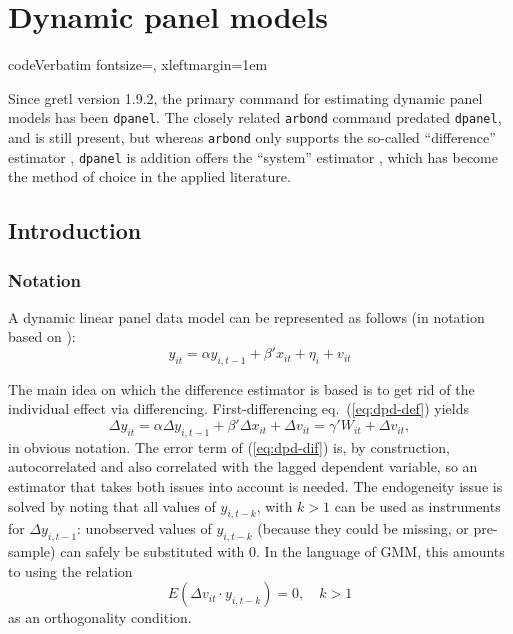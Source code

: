 \chapter{Dynamic panel models}
\label{chap:dpanel}

\newcommand{\by}{\boldsymbol{y}}
\newcommand{\bx}{\boldsymbol{x}}
\newcommand{\bv}{\boldsymbol{v}}
\newcommand{\bX}{\boldsymbol{X}}
\newcommand{\bW}{\boldsymbol{W}}
\newcommand{\bZ}{\boldsymbol{Z}}
\newcommand{\bA}{\boldsymbol{A}}
\newcommand{\biota}{\bm{\iota}}

\DefineVerbatimEnvironment%
{code}{Verbatim}
{fontsize=\small, xleftmargin=1em}

\newenvironment%
{altcode}%
{\vspace{1ex}\small\leftmargin 1em}{\vspace{1ex}}

Since gretl version 1.9.2, the primary command for estimating dynamic
panel models has been \texttt{dpanel}. The closely related
\texttt{arbond} command predated \texttt{dpanel}, and is still
present, but whereas \texttt{arbond} only supports the so-called
``difference'' estimator \citep{arellano-bond91}, \texttt{dpanel} is
addition offers the ``system'' estimator \citep{blundell-bond98},
which has become the method of choice in the applied literature.

\section{Introduction}
\subsection{Notation}
\label{sec:notation}

A dynamic linear panel data model can be represented as follows
(in notation based on \cite{arellano03}):
\begin{equation}
  \label{eq:dpd-def}
  y_{it} = \alpha y_{i,t-1} + \beta'x_{it} + \eta_{i} + v_{it}
\end{equation}

The main idea on which the difference estimator is based is to get rid
of the individual effect via differencing.  First-differencing eq.\
(\ref{eq:dpd-def}) yields
\begin{equation}
  \label{eq:dpd-dif}
  \Delta y_{it} = \alpha \Delta y_{i,t-1} + \beta'\Delta x_{it} +
  \Delta v_{it} = \gamma' W_{it} + \Delta v_{it} ,
\end{equation}
in obvious notation. The error term of (\ref{eq:dpd-dif}) is, by
construction, autocorrelated and also correlated with the lagged
dependent variable, so an estimator that takes both issues into
account is needed. The endogeneity issue is solved by noting that all
values of $y_{i,t-k}$, with $k>1$ can be used as instruments for
$\Delta y_{i,t-1}$: unobserved values of $y_{i,t-k}$ (because they
could be missing, or pre-sample) can safely be substituted with 0. In
the language of GMM, this amounts to using the relation
\begin{equation}
  \label{eq:OC-dif}
  E(\Delta v_{it} \cdot y_{i,t-k}) = 0, \quad k>1
\end{equation}
as an orthogonality condition.


